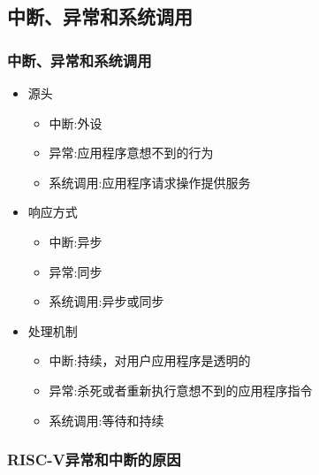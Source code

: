 \subsection{中断、异常和系统调用}
\begin{frame}
	\frametitle{中断、异常和系统调用}

    \begin{itemize}
        \item 源头
        \begin{itemize}
            \item 中断:外设
            \item 异常:应用程序意想不到的行为
            \item 系统调用:应用程序请求操作提供服务
        \end{itemize}
        \item 响应方式
        \begin{itemize}
            \item 中断:异步
            \item 异常:同步
            \item 系统调用:异步或同步
        \end{itemize}
        \item 处理机制
        \begin{itemize}
            \item 中断:持续，对用户应用程序是透明的
            \item 异常:杀死或者重新执行意想不到的应用程序指令
            \item 系统调用:等待和持续
        \end{itemize}
    \end{itemize}
\end{frame}
\begin{frame}
	\frametitle{RISC-V异常和中断的原因}
\end{frame}
% 
